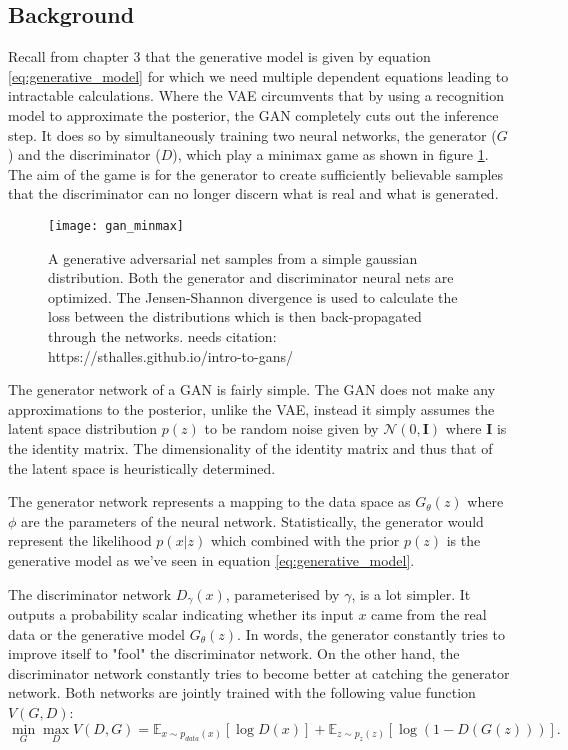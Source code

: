 \documentclass[main.tex]{subfiles}
\begin{document}
\subsection{Background}

Recall from chapter 3 that the generative model is given by equation \eqref{eq:generative_model} for which we need multiple dependent equations leading to intractable calculations. Where the VAE circumvents that by using a recognition model to approximate the posterior, the GAN completely cuts out the inference step. It does so by simultaneously training two neural networks, the generator ($G$) and the discriminator ($D$), which play a minimax game as shown in figure \ref{fig:gan_minmax}. The aim of the game is for the generator to create sufficiently believable samples that the discriminator can no longer discern what is real and what is generated. 

\begin{figure}[h]
    \centering
    \texttt{[image: gan\_minmax]}
    \caption{A generative adversarial net samples from a simple gaussian distribution. Both the generator and discriminator neural nets are optimized. The Jensen-Shannon divergence is used to calculate the loss between the distributions which is then back-propagated through the networks. needs citation: https://sthalles.github.io/intro-to-gans/}
    \label{fig:gan_minmax}
\end{figure}

The generator network of a GAN is fairly simple. The GAN does not make any approximations to the posterior, unlike the VAE, instead it simply assumes the latent space distribution $p(z)$ to be random noise given by $\mathcal{N}(0,\mathbf{I})$ where $\mathbf{I}$ is the identity matrix. The dimensionality of the identity matrix and thus that of the latent space is heuristically determined.

The generator network represents a mapping to the data space as $G_\theta(z)$ where $\phi$ are the parameters of the neural network. Statistically, the generator would represent the likelihood $p(x|z)$ which combined with the prior $p(z)$ is the generative model as we've seen in equation \eqref{eq:generative_model}.

The discriminator network $D_\gamma(x)$, parameterised by $\gamma$, is a lot simpler. It outputs a probability scalar indicating whether its input $x$ came from the real data or the generative model $G_\theta(z)$. In words, the generator constantly tries to improve itself to "fool" the discriminator network. On the other hand, the discriminator network constantly tries to become better at catching the generator network. Both networks are jointly trained with the following value function $V(G,D)$:
\begin{equation}
\label{eq:gan_minimax}
  \min_{G} \max_{D} V(D,G) = \mathbb{E}_{x\sim p_{data}(x)} [\log D(x)] + \mathbb{E}_{z\sim p_z(z)}[\log(1-D(G(z)))].
\end{equation}
\end{document}
